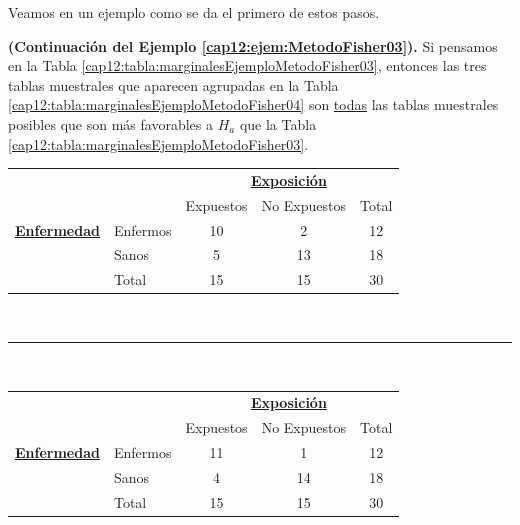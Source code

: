Veamos en un ejemplo como se da el primero de estos pasos.
\begin{ejemplo}
\label{cap12:ejem:MetodoFisher04}
{\bf (Continuación del Ejemplo \ref{cap12:ejem:MetodoFisher03}).}
Si pensamos en la Tabla \ref{cap12:tabla:marginalesEjemploMetodoFisher03}, entonces las tres tablas muestrales que aparecen agrupadas en la Tabla \ref{cap12:tabla:marginalesEjemploMetodoFisher04} son \underline{todas} las tablas muestrales posibles que son más favorables a $H_a$ que la Tabla \ref{cap12:tabla:marginalesEjemploMetodoFisher03}.

        \begin{table}[h!]
        \begin{center}
            \begin{tabular}{llccc}
            &&\multicolumn{3}{c}{\underline{\bf Exposición}}\\

                                      &          & Expuestos &  No Expuestos& Total\\
            \cline{2-5}
          \underline{\bf Enfermedad} & Enfermos & 10&  2&   12\\
                                      & Sanos &   5& 13&  18\\
            \cline{2-5}
                                      & Total    & 15& 15& 30\\
            \cline{2-5}
            \end{tabular}\\[3mm]


            \hrule
            \quad\\[3mm]

            \begin{tabular}{llccc}
            &&\multicolumn{3}{c}{\underline{\bf Exposición}}\\

                                      &          & Expuestos &  No Expuestos& Total\\
            \cline{2-5}
          \underline{\bf Enfermedad} & Enfermos & 11&  1&   12\\
                                      & Sanos &   4& 14&  18\\
            \cline{2-5}
                                      & Total    & 15& 15& 30\\
            \cline{2-5}
            \end{tabular}\\[3mm]


\end{center}
\end{table}
\end{ejemplo}
